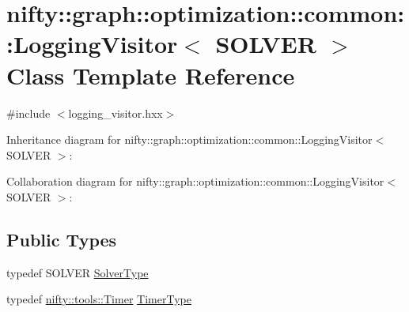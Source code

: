 \hypertarget{classnifty_1_1graph_1_1optimization_1_1common_1_1LoggingVisitor}{}\section{nifty\+:\+:graph\+:\+:optimization\+:\+:common\+:\+:Logging\+Visitor$<$ S\+O\+L\+V\+E\+R $>$ Class Template Reference}
\label{classnifty_1_1graph_1_1optimization_1_1common_1_1LoggingVisitor}


{\ttfamily \#include $<$logging\+\_\+visitor.\+hxx$>$}



Inheritance diagram for nifty\+:\+:graph\+:\+:optimization\+:\+:common\+:\+:Logging\+Visitor$<$ S\+O\+L\+V\+E\+R $>$\+:


Collaboration diagram for nifty\+:\+:graph\+:\+:optimization\+:\+:common\+:\+:Logging\+Visitor$<$ S\+O\+L\+V\+E\+R $>$\+:
\subsection*{Public Types}
\begin{DoxyCompactItemize}
\item 
typedef S\+O\+L\+V\+E\+R \hyperlink{classnifty_1_1graph_1_1optimization_1_1common_1_1LoggingVisitor_a948f90213104a37e586b5024cb918f40}{Solver\+Type}
\item 
typedef \hyperlink{classnifty_1_1tools_1_1Timer}{nifty\+::tools\+::\+Timer} \hyperlink{classnifty_1_1graph_1_1optimization_1_1common_1_1LoggingVisitor_a38539dee10778eecf56be540fd64eea2}{Timer\+Type}
\end{DoxyCompactItemize}
